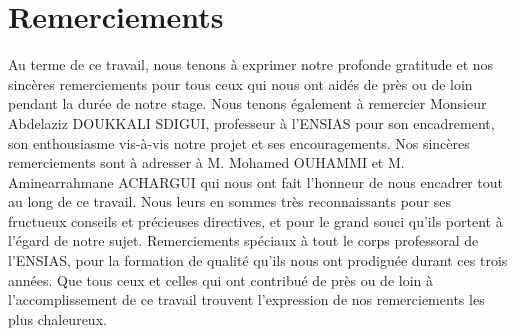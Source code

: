 \chapter*{Remerciements}
\begin{onehalfspace}
Au terme de ce travail, nous tenons à exprimer notre profonde gratitude et nos sincères remerciements pour tous ceux qui nous ont aidés de près ou de loin pendant la durée de notre stage.
\newline
\newline
Nous tenons également à remercier Monsieur Abdelaziz DOUKKALI SDIGUI, professeur à l'ENSIAS pour son encadrement, son enthousiasme vis-à-vis notre projet et ses encouragements. Nos sincères remerciements sont à adresser à M. Mohamed OUHAMMI et M. Aminearrahmane ACHARGUI qui nous ont fait l'honneur de nous encadrer tout au long de ce travail. Nous leurs en sommes très reconnaissants pour ses fructueux conseils et précieuses directives, et pour le grand souci qu'ils portent à l'égard de notre sujet. 
\newline
\newline
Remerciements spéciaux à tout le corps professoral de l'ENSIAS, pour la formation de qualité qu'ils nous ont prodiguée durant ces trois années. Que tous ceux et celles qui ont contribué de près ou de loin à l'accomplissement de ce travail trouvent l'expression de nos remerciements les plus chaleureux.
\end{onehalfspace}